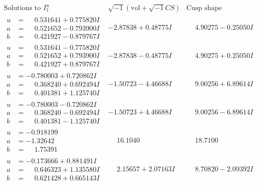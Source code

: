 \documentclass[1p]{elsarticle_modified}
\theoremstyle{definition}
\newcommand{\I}{\sqrt{-1}}
\begin{document}
$$\begin{array}{c|c|c}  
\text{Solutions to }I^u_{1}& \I (\text{vol} + \sqrt{-1}CS) & \text{Cusp shape}\\
 \hline 
\begin{aligned}
u &= \phantom{-}0.531641 + 0.775820 I \\
a &= \phantom{-}0.521652 - 0.793900 I \\
b &= \phantom{-}0.421927 - 0.879767 I\end{aligned}
 & -2.87838 + 0.48775 I & \phantom{-}4.90275 - 0.25050 I \\ \hline\begin{aligned}
u &= \phantom{-}0.531641 - 0.775820 I \\
a &= \phantom{-}0.521652 + 0.793900 I \\
b &= \phantom{-}0.421927 + 0.879767 I\end{aligned}
 & -2.87838 - 0.48775 I & \phantom{-}4.90275 + 0.25050 I \\ \hline\begin{aligned}
u &= -0.780003 + 0.720862 I \\
a &= \phantom{-}0.368240 + 0.692494 I \\
b &= \phantom{-}0.401381 + 1.125740 I\end{aligned}
 & -1.50723 - 4.46688 I & \phantom{-}9.00256 + 6.89614 I \\ \hline\begin{aligned}
u &= -0.780003 - 0.720862 I \\
a &= \phantom{-}0.368240 - 0.692494 I \\
b &= \phantom{-}0.401381 - 1.125740 I\end{aligned}
 & -1.50723 + 4.46688 I & \phantom{-}9.00256 - 6.89614 I \\ \hline\begin{aligned}
u &= -0.918199\phantom{ +0.000000I} \\
a &= -1.32642\phantom{ +0.000000I} \\
b &= \phantom{-}1.75391\phantom{ +0.000000I}\end{aligned}
 & \phantom{-}16.1040\phantom{ +0.000000I} & \phantom{-}18.7100\phantom{ +0.000000I} \\ \hline\begin{aligned}
u &= -0.173666 + 0.881491 I \\
a &= \phantom{-}0.646323 + 1.135580 I \\
b &= \phantom{-}0.621428 + 0.665143 I\end{aligned}
 & \phantom{-}2.15657 + 2.07163 I & \phantom{-}8.70820 - 2.09392 I \\ \hline\begin{aligned}

\end{aligned}
\end{array}$$
\end{document}
